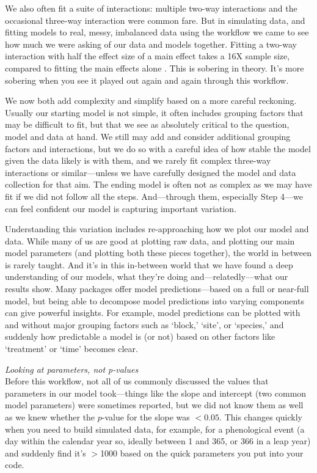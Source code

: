 \documentclass[11pt]{article}
\begin{document}
{We also often fit a suite of interactions: multiple two-way interactions and the occasional three-way interaction were common fare. But in simulating data, and fitting models to real, messy, imbalanced data using the workflow we came to see how much we were asking of our data and models together. Fitting a two-way interaction with half the effect size of a main effect takes a 16X sample size, compared to fitting the main effects alone \citep[the main effects then average over the interactions, see][for more details]{regotherstories}. This is sobering in theory. It's more sobering when you see it played out again and again through this workflow. 

We now both add complexity and simplify based on a more careful reckoning. Usually our starting model is not simple, it often includes grouping factors that may be difficult to fit, but that we see as absolutely critical to the question, model and data at hand. We still may add and consider additional grouping factors and interactions, but we do so with a careful idea of how stable the model given the data likely is with them, and we rarely fit complex three-way interactions or similar---unless we have carefully designed the model and data collection for that aim. The ending model is often not as complex as we may have fit if we did not follow all the steps. And---through them, especially Step 4---we can feel confident our model is capturing important variation. 

Understanding this variation includes re-approaching how we plot our model and data. While many of us are good at plotting raw data, and plotting our main model parameters (and plotting both these pieces together), the world in between is rarely taught. And it's in this in-between world that we have found a deep understanding of our models, what they're doing and---relatedly---what our results show. Many packages offer model predictions---based on a full or near-full model, but being able to decompose model predictions into varying components can give powerful insights. For example, model predictions can be plotted with and without major grouping factors such as `block,' `site', or `species,' and suddenly how predictable a model is (or not) based on other factors like `treatment' or `time' becomes clear. 

 \emph{Looking at parameters, not p-values} \\
Before this workflow, not all of us commonly discussed the values that parameters in our model took---things like the slope and intercept (two common model parameters) were sometimes reported, but we did not know them as well as we knew whether the $p$-value for the slope was $<0.05$. This changes quickly when you need to build simulated data, for example, for a phenological event (a day within the calendar year so, ideally between 1 and 365, or 366 in a leap year) and suddenly find it's $>$1000 based on the quick parameters you put into your code. 

}
\end{document}
